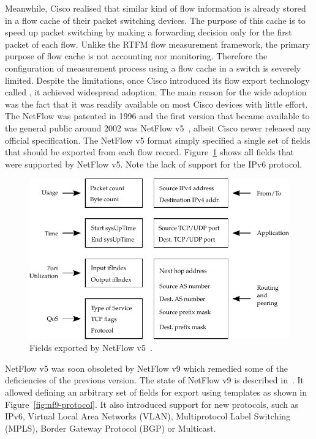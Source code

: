 Meanwhile, Cisco realised that similar kind of flow information is already stored in a flow cache of their packet switching devices. The purpose of this cache is to speed up packet switching by making a forwarding decision only for the first packet of each flow. Unlike the RTFM flow measurement framework, the primary purpose of flow cache is not accounting nor monitoring. Therefore the configuration of measurement process using a flow cache in a switch is severely limited. Despite the limitations, once Cisco introduced its flow export technology called , it achieved widespread adoption. The main reason for the wide adoption was the fact that it was readily available on most Cisco devices with little effort. The NetFlow was patented in 1996 and the first version that became available to the general public around 2002 was NetFlow v5~\cite{CiscoSystems-2007-NetFlow}, albeit Cisco newer released any official specification. The NetFlow v5 format simply specified a single set of fields that should be exported from each flow record. Figure~\ref{fig:nf5-fields} shows all fields that were supported by NetFlow v5. Note the lack of support for the IPv6 protocol.

\begin{figure}[t!]
  \begin{center}
    \includegraphics{figures/c02/nf5-fields}
  \end{center}
  \caption{Fields exported by NetFlow v5~\cite{CiscoSystems-2007-NetFlow}.}
  \label{fig:nf5-fields}
\end{figure}

NetFlow v5 was soon obsoleted by NetFlow v9 which remedied some of the deficiencies of the previous version. The state of NetFlow v9 is described in~\cite{rfc3954}. It allowed defining an arbitrary set of fields for export using templates as shown in Figure~\ref{fig:nf9-protocol}. It also introduced support for new protocols, such as IPv6, Virtual Local Area Networks (VLAN), Multiprotocol Label Switching (MPLS), Border Gateway Protocol (BGP) or Multicast. 

